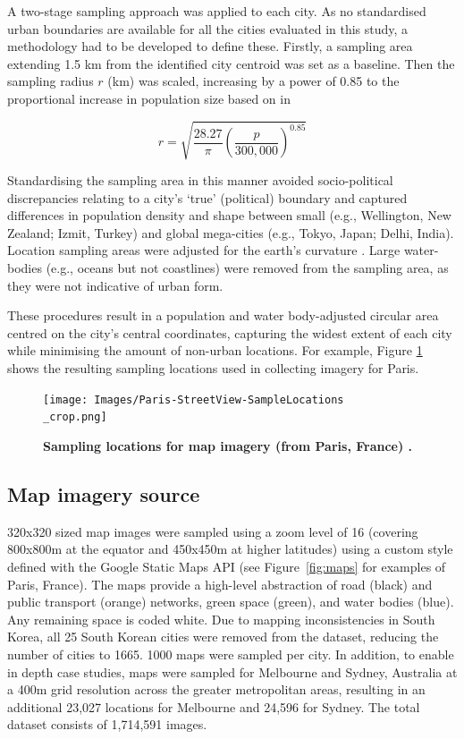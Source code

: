\documentclass{nature}
\begin{document}
A two-stage sampling approach was applied to each city. As no standardised urban boundaries are available for all the cities evaluated in this study, a methodology had to be developed to define these. Firstly, a sampling area extending 1.5 km from the identified city centroid \cite{UN2014} was set as a baseline. Then the sampling radius $r$ (km) was scaled, increasing by a power of 0.85 to the proportional increase in population size based on \cite{Barthelemy2016} in 

\begin{equation}
r = \sqrt{ \frac{28.27}{\pi} \left( \frac{p}{300,000}  \right) ^{0.85} }
\end{equation}


Standardising the sampling area in this manner avoided socio-political discrepancies relating to a city's `true' (political) boundary and captured differences in population density and shape between small (e.g., Wellington, New Zealand; Izmit, Turkey) and global mega-cities (e.g., Tokyo, Japan;  Delhi, India). Location sampling areas were adjusted for the earth's curvature \cite{Sinnott1984}. Large water-bodies (e.g., oceans but not coastlines) were removed from the sampling area, as they were not indicative of urban form. 

These procedures result in a population and water body-adjusted circular area centred on the city's central coordinates, capturing the widest extent of each city while minimising the amount of non-urban locations. For example, Figure \ref{fig:parissample} shows the resulting sampling locations used in collecting imagery for Paris. 

\begin{figure}
    \centering    
\texttt{[image: Images/Paris-StreetView-SampleLocations\\\_crop.png]}  
\caption{\bf Sampling locations for map imagery (from Paris, France) \cite{GoogleStatic2017}.}    
 \label{fig:parissample}  
\end{figure} 



\subsection{Map imagery source}\label{methodsimagery}

320x320 sized map images were sampled using a zoom level of 16 (covering 800x800m at the equator and 450x450m at higher latitudes) using a custom style defined with the Google Static Maps API\cite{GoogleStatic2017} (see Figure~\ref{fig:maps} for examples of Paris, France). The maps provide a high-level abstraction of road (black) and public transport (orange) networks, green space (green), and water bodies (blue). Any remaining space is coded white. Due to mapping inconsistencies in South Korea, all 25 South Korean cities were removed from the dataset, reducing the number of cities to 1665. 1000 maps were sampled per city. In addition, to enable in depth case studies, maps were sampled for Melbourne and Sydney, Australia at a 400m grid resolution across the greater metropolitan areas, resulting in an additional 23,027 locations for Melbourne and 24,596 for Sydney. The total dataset consists of 1,714,591 images.
\end{document}
